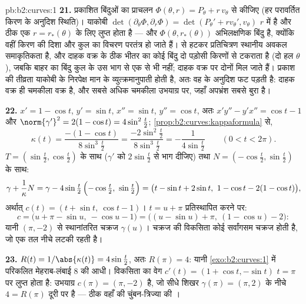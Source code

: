\begin{solution}{pb:b2:curves:1}
\textbf{21.} प्रकाशित बिंदुओं का प्राचलन
$\Phi(\theta, r) = P_\theta + r\,v_\theta$ से कीजिए (हर परावर्तित
किरण के अनुदिश स्थिति)। याकोबी 
$\det(\partial_\theta\Phi, \partial_r\Phi) =
\det(P_\theta' + rv_\theta', v_\theta)$ $r$ में  है और ठीक एक $r = r_*(\theta)$ के लिए
लुप्त होता है --- और $\Phi(\theta, r_*(\theta))$ अभिलक्षणिक बिंदु है, क्योंकि
वहीं किरण की दिशा और कुल का विचरण परतंत्र हो जाते हैं।  से
हटकर प्रतिचित्रण स्थानीय अवकल समाकृतिकता है, और दाहक वक्र के ठीक
भीतर का कोई बिंदु दो पड़ोसी किरणों से टकराता है (दो हल $\theta$),
जबकि बाहर का बिंदु कुल के उस भाग से एक से भी नहीं; दाहक वक्र पर
दोनों मिल जाते हैं। प्रकाश की तीव्रता याकोबी  के निरपेक्ष मान
के व्युत्क्रमानुपाती होती है, अतः वह  के अनुदिश फट पड़ती है:
दाहक वक्र ही चमकीला वक्र है, और सबसे अधिक चमकीला उभयाग्र पर, जहाँ
अपभ्रंश सबसे बुरा है।

\textbf{22.} $x' = 1 - \cos t$, $y' = \sin t$, $x'' = \sin
t$, $y'' = \cos t$, अतः $x'y'' - y'x'' = \cos t - 1$ और
$\norm{\gamma'}^2 = 2(1 - \cos t) = 4\sin^2\tfrac t2$;
\cref{prop:b2:curves:kappaformula} से,
\[
\kappa(t) = \frac{-(1 - \cos t)}{8\sin^3\tfrac t2}
= \frac{-2\sin^2\tfrac t2}{8\sin^3\tfrac t2}
= -\frac1{4\sin\tfrac t2}
\qquad (0 < t < 2\pi).
\]
$T = (\sin\tfrac t2, \cos\tfrac t2)$ के साथ ($\gamma'$ को
$2\sin\tfrac t2$ से भाग दीजिए) तथा $N = (-\cos\tfrac t2, \sin\tfrac
t2)$ के साथ:
\[
\gamma + \frac1\kappa N
= \gamma - 4\sin\tfrac t2\,\Bigl(-\cos\tfrac t2,\
\sin\tfrac t2\Bigr)
= \bigl(t - \sin t + 2\sin t,\ 1 - \cos t - 2(1 - \cos
t)\bigr),
\]
अर्थात् $c(t) = (t + \sin t,\ \cos t - 1)$। $t = u
+ \pi$ प्रतिस्थापित करने पर:
\[
c = \bigl(u + \pi - \sin u,\ -\cos u - 1\bigr)
= \bigl((u - \sin u) + \pi,\ (1 - \cos u) - 2\bigr) :
\]
यानी $(\pi, -2)$ से स्थानांतरित चक्रज $\gamma(u)$। चक्रज की
विकसिता कोई सर्वांगसम चक्रज होती है, जो एक तल नीचे लटकी रहती है।

\textbf{23.} $R(t) = 1/\abs{\kappa(t)} = 4\sin\tfrac t2$, अतः
$R(\pi) = 4$: यानी \cref{exo:b2:curves:1} में परिकलित मेहराब-लंबाई $8$ की आधी।
विकसिता का वेग $c'(t) = (1 +
\cos t, -\sin t)$ $t = \pi$ पर लुप्त होता है: उभयाग्र $c(\pi)
= (\pi, -2)$ है, जो सीधे शिखर $\gamma(\pi) = (\pi,
2)$ के नीचे $4 = R(\pi)$ दूरी पर है --- ठीक वहाँ की
चुंबन-त्रिज्या की ।


\end{solution}
